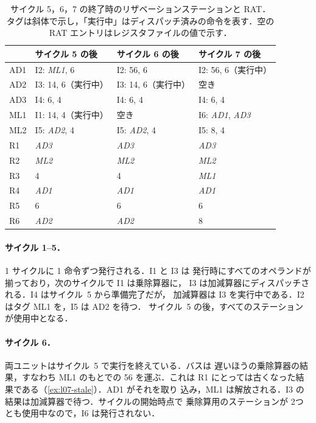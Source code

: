 \documentclass[../main.tex]{subfiles}
\begin{document}
\begin{table}[htbp]
  \centering\small
  \caption{サイクル 5，6，7 の終了時のリザベーションステーションと RAT．
    タグは斜体で示し，「実行中」はディスパッチ済みの命令を表す．空の RAT
    エントリはレジスタファイルの値で示す．}
  \label{tab:l07-state}
  \begin{tabular}{@{}llll@{}}
    \toprule
    & サイクル 5 の後 & サイクル 6 の後 & サイクル 7 の後 \\
    \midrule
    AD1 & I2: \textit{ML1}, 6       & I2: 56, 6              & I2: 56, 6（実行中） \\
    AD2 & I3: 14, 6（実行中）       & I3: 14, 6（実行中）    & 空き \\
    AD3 & I4: 6, 4                  & I4: 6, 4               & I4: 6, 4 \\
    ML1 & I1: 14, 4（実行中）       & 空き                   & I6: \textit{AD1}, \textit{AD3} \\
    ML2 & I5: \textit{AD2}, 4       & I5: \textit{AD2}, 4    & I5: 8, 4 \\
    \midrule
    R1  & \textit{AD3} & \textit{AD3} & \textit{AD3} \\
    R2  & \textit{ML2} & \textit{ML2} & \textit{ML2} \\
    R3  & 4            & 4            & \textit{ML1} \\
    R4  & \textit{AD1} & \textit{AD1} & \textit{AD1} \\
    R5  & 6            & 6            & 6 \\
    R6  & \textit{AD2} & \textit{AD2} & 8 \\
    \bottomrule
  \end{tabular}
\end{table}

\paragraph{サイクル 1--5．}1 サイクルに 1 命令ずつ発行される．I1 と I3 は
発行時にすべてのオペランドが揃っており，次のサイクルで I1 は乗除算器に，
I3 は加減算器にディスパッチされる．I4 はサイクル~5 から準備完了だが，
加減算器は I3 を実行中である．I2 はタグ ML1 を，I5 は AD2 を待つ．
サイクル~5 の後，すべてのステーションが使用中となる．

\paragraph{サイクル 6．}両ユニットはサイクル~5 で実行を終えている．バスは
遅いほうの乗除算器の結果，すなわち ML1 のもとでの 56 を運ぶ．これは R1
にとっては古くなった結果である（\cref{ex:l07-stale}）．AD1 がそれを取り
込み，ML1 は解放される．I3 の結果は加減算器で待つ．サイクルの開始時点で
乗除算用のステーションが 2つとも使用中なので，I6 は発行されない．
\end{document}
